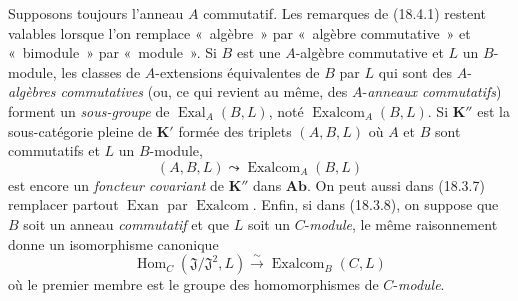 \begin{env}[18.4.2]
\label{0.18.4.2-fr}
Supposons toujours l'anneau $A$ commutatif. Les remarques de (18.4.1) restent
valables lorsque l'on remplace «~algèbre~» par «~algèbre commutative~» et
«~bimodule~» par «~module~». Si $B$ est une $A$-algèbre commutative et $L$ un
$B$-module,
les classes de $A$-extensions équivalentes de $B$ par $L$ qui sont des
$A$-\emph{algèbres commutatives} (ou, ce qui revient au même, des
$A$-\emph{anneaux commutatifs}) forment un \emph{sous-groupe} de
$\operatorname{Exal}_A(B,L)$, noté $\operatorname{Exalcom}_A(B,L)$. Si
$\boldsymbol{K}''$ est la sous-catégorie pleine de $\boldsymbol{K}'$ formée des triplets
$(A,B,L)$ où $A$ et $B$ sont commutatifs et $L$ un $B$-module,
\[
  (A,B,L)\leadsto\operatorname{Exalcom}_A(B,L)
\]
est encore un \emph{foncteur covariant} de $\boldsymbol{K}''$ dans $\boldsymbol{Ab}$. On
peut aussi dans (18.3.7) remplacer partout $\operatorname{Exan}$ par
$\operatorname{Exalcom}$. Enfin, si dans (18.3.8), on suppose que $B$ soit un
anneau \emph{commutatif} et que $L$ soit un $C$-\emph{module}, le même
raisonnement donne un isomorphisme canonique
\begin{equation}
\label{0.18.4.2.1-fr}
\tag{18.4.2.1}
  \operatorname{Hom}_C(\mathfrak J/\mathfrak J^2,L)
  \xrightarrow{\sim}\operatorname{Exalcom}_B(C,L)
\end{equation}
où le premier membre est le groupe des homomorphismes de $C$-\emph{module}.
\end{env}

